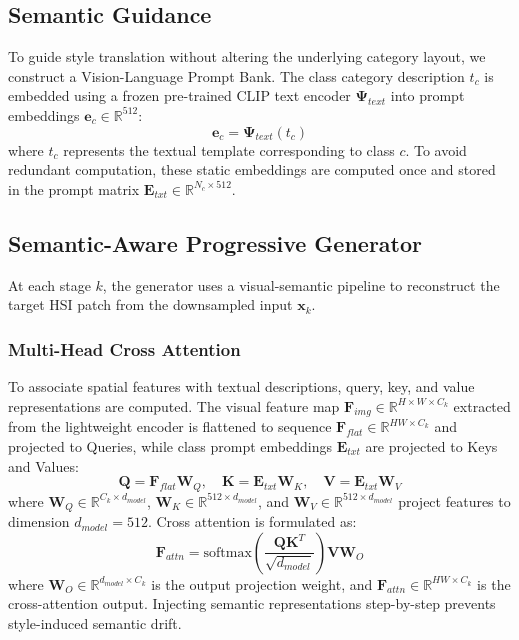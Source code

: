 \subsection{Semantic Guidance}
To guide style translation without altering the underlying category layout, we construct a Vision-Language Prompt Bank. The class category description $t_c$ is embedded using a frozen pre-trained CLIP text encoder $\mathbf{\Psi}_{text}$ into prompt embeddings $\mathbf{e}_c \in \mathbb{R}^{512}$:
\begin{equation}
\mathbf{e}_c = \mathbf{\Psi}_{text}(t_c)
\end{equation}
where $t_c$ represents the textual template corresponding to class $c$. To avoid redundant computation, these static embeddings are computed once and stored in the prompt matrix $\mathbf{E}_{txt} \in \mathbb{R}^{N_c \times 512}$.

\subsection{Semantic-Aware Progressive Generator}
At each stage $k$, the generator uses a visual-semantic pipeline to reconstruct the target HSI patch from the downsampled input $\mathbf{x}_k$.

\subsubsection{Multi-Head Cross Attention}
To associate spatial features with textual descriptions, query, key, and value representations are computed. The visual feature map $\mathbf{F}_{img} \in \mathbb{R}^{H \times W \times C_k}$ extracted from the lightweight encoder is flattened to sequence $\mathbf{F}_{flat} \in \mathbb{R}^{HW \times C_k}$ and projected to Queries, while class prompt embeddings $\mathbf{E}_{txt}$ are projected to Keys and Values:
\begin{equation}
\mathbf{Q} = \mathbf{F}_{flat} \mathbf{W}_Q, \quad \mathbf{K} = \mathbf{E}_{txt} \mathbf{W}_K, \quad \mathbf{V} = \mathbf{E}_{txt} \mathbf{W}_V
\end{equation}
where $\mathbf{W}_Q \in \mathbb{R}^{C_k \times d_{model}}$, $\mathbf{W}_K \in \mathbb{R}^{512 \times d_{model}}$, and $\mathbf{W}_V \in \mathbb{R}^{512 \times d_{model}}$ project features to dimension $d_{model} = 512$. Cross attention is formulated as:
\begin{equation}
\mathbf{F}_{attn} = \text{softmax}\left(\frac{\mathbf{Q} \mathbf{K}^T}{\sqrt{d_{model}}}\right) \mathbf{V} \mathbf{W}_O
\end{equation}
where $\mathbf{W}_O \in \mathbb{R}^{d_{model} \times C_k}$ is the output projection weight, and $\mathbf{F}_{attn} \in \mathbb{R}^{HW \times C_k}$ is the cross-attention output. Injecting semantic representations step-by-step prevents style-induced semantic drift.

